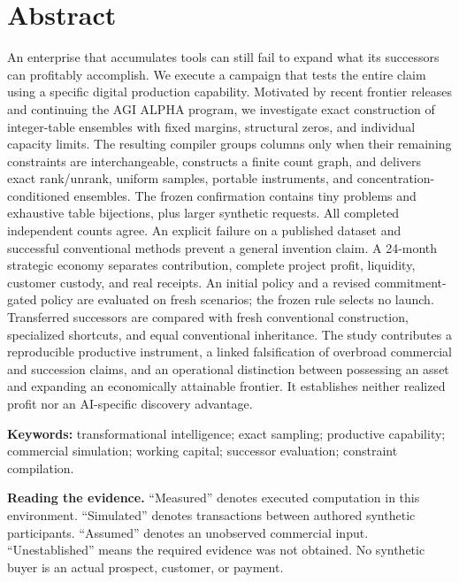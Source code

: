 \documentclass[11pt,letterpaper]{article}
\begin{document}
\section*{Abstract}
An enterprise that accumulates tools can still fail to expand what its successors can
profitably accomplish. We execute a campaign that tests the entire claim using a
specific digital production capability. Motivated by recent frontier releases and
continuing the AGI ALPHA program, we investigate exact construction of integer-table
ensembles with fixed margins, structural zeros, and individual capacity limits.
The resulting compiler groups columns only when their remaining constraints are
interchangeable, constructs a finite count graph, and delivers exact rank/unrank,
uniform samples, portable instruments, and concentration-conditioned ensembles.
The frozen confirmation contains \SmallCases{} tiny problems and \Bijections{}
exhaustive table bijections, plus \PerformanceCases{} larger synthetic requests.
All completed independent counts agree. An explicit failure on a published dataset
and successful conventional methods prevent a general invention claim.
A 24-month strategic economy separates contribution, complete project profit,
liquidity, customer custody, and real receipts. An initial policy and a revised
commitment-gated policy are evaluated on fresh scenarios; the frozen rule selects
no launch. Transferred successors are compared with fresh conventional construction,
specialized shortcuts, and equal conventional inheritance. The study contributes a
reproducible productive instrument, a linked falsification of overbroad commercial
and succession claims, and an operational distinction between possessing an asset
and expanding an economically attainable frontier. It establishes neither realized
profit nor an AI-specific discovery advantage.

\textbf{Keywords:} transformational intelligence; exact sampling; productive capability;
commercial simulation; working capital; successor evaluation; constraint compilation.

\begin{evidencebox}
\textbf{Reading the evidence.} ``Measured'' denotes executed computation in this
environment. ``Simulated'' denotes transactions between authored synthetic participants.
``Assumed'' denotes an unobserved commercial input. ``Unestablished'' means the required
evidence was not obtained. No synthetic buyer is an actual prospect, customer, or payment.
\end{evidencebox}
\end{document}
